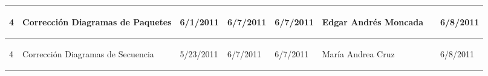 \begin{center}
\begin{longtable}{|p{}|p{}|p{}|p{}|p{}|p{}|p{}|p{}|}
{\begin{center} 4 \end{center}} & 
{\begin{center} Corrección Diagramas de Paquetes \end{center}} & 
{\begin{center} 6/1/2011 \end{center}} & 
{\begin{center} 6/7/2011 \end{center}} & 
{\begin{center} 6/7/2011 \end{center}} & 
{\begin{center} Edgar Andrés Moncada \end{center}} & 
{\begin{center}  \end{center}} & 
{\begin{center} 6/8/2011 \end{center}}\\
\hline
	
{\begin{center} 4 \end{center}} & 
{\begin{center} Corrección Diagramas de Secuencia \end{center}} & 
{\begin{center} 5/23/2011 \end{center}} & 
{\begin{center} 6/7/2011 \end{center}} & 
{\begin{center} 6/7/2011 \end{center}} & 
{\begin{center}  María Andrea Cruz \end{center}} & 
{\begin{center}  \end{center}} & 
{\begin{center} 6/8/2011 \end{center}}\\
\hline


\end{longtable}
\end{center}
